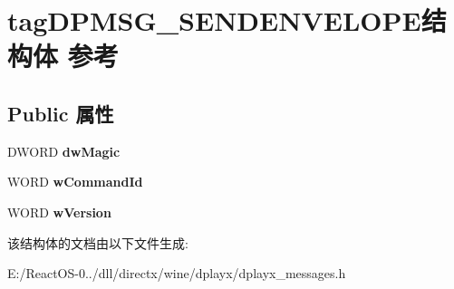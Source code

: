 \hypertarget{structtag_d_p_m_s_g___s_e_n_d_e_n_v_e_l_o_p_e}{}\section{tag\+D\+P\+M\+S\+G\+\_\+\+S\+E\+N\+D\+E\+N\+V\+E\+L\+O\+P\+E结构体 参考}
\label{structtag_d_p_m_s_g___s_e_n_d_e_n_v_e_l_o_p_e}
\subsection*{Public 属性}
\begin{DoxyCompactItemize}
\item 
\mbox{\label{structtag_d_p_m_s_g___s_e_n_d_e_n_v_e_l_o_p_e_ac036cc112508f1ff555d173d587d370d}} 
D\+W\+O\+RD {\bfseries dw\+Magic}
\item 
\mbox{\label{structtag_d_p_m_s_g___s_e_n_d_e_n_v_e_l_o_p_e_a451c9189a5af1186f5f9764986d103e0}} 
W\+O\+RD {\bfseries w\+Command\+Id}
\item 
\mbox{\label{structtag_d_p_m_s_g___s_e_n_d_e_n_v_e_l_o_p_e_abd8dd7e323e5d405649618973554eeea}} 
W\+O\+RD {\bfseries w\+Version}
\end{DoxyCompactItemize}


该结构体的文档由以下文件生成\+:\begin{DoxyCompactItemize}
\item 
E\+:/\+React\+O\+S-\/0../dll/directx/wine/dplayx/dplayx\+\_\+messages.\+h\end{DoxyCompactItemize}
